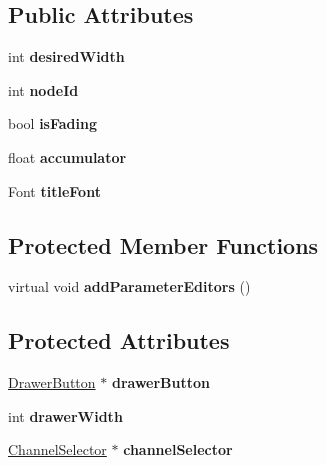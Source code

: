 \subsection*{Public Attributes}
\begin{DoxyCompactItemize}
\item 
\hypertarget{classGenericEditor_ab5b6f3450c9376c313fe8925bfbe4bc9}{int {\bfseries desired\-Width}}\label{classGenericEditor_ab5b6f3450c9376c313fe8925bfbe4bc9}

\item 
\hypertarget{classGenericEditor_a53166218592772efb4f6ef664ec4763b}{int {\bfseries node\-Id}}\label{classGenericEditor_a53166218592772efb4f6ef664ec4763b}

\item 
\hypertarget{classGenericEditor_af961769014471610d0eeeeefb8e712ef}{bool {\bfseries is\-Fading}}\label{classGenericEditor_af961769014471610d0eeeeefb8e712ef}

\item 
\hypertarget{classGenericEditor_ab4430a824b8ea6f3d3bd55ef037c40d2}{float {\bfseries accumulator}}\label{classGenericEditor_ab4430a824b8ea6f3d3bd55ef037c40d2}

\item 
\hypertarget{classGenericEditor_ac544d3401113c612bf992feacc68d961}{Font {\bfseries title\-Font}}\label{classGenericEditor_ac544d3401113c612bf992feacc68d961}

\end{DoxyCompactItemize}
\subsection*{Protected Member Functions}
\begin{DoxyCompactItemize}
\item 
\hypertarget{classGenericEditor_aace3206666ab83eb3f89d604bbe1998f}{virtual void {\bfseries add\-Parameter\-Editors} ()}\label{classGenericEditor_aace3206666ab83eb3f89d604bbe1998f}

\end{DoxyCompactItemize}
\subsection*{Protected Attributes}
\begin{DoxyCompactItemize}
\item 
\hypertarget{classGenericEditor_afb5e6e83bf76e18fb0d3d2b1d75ee8b5}{\hyperlink{classDrawerButton}{Drawer\-Button} $\ast$ {\bfseries drawer\-Button}}\label{classGenericEditor_afb5e6e83bf76e18fb0d3d2b1d75ee8b5}

\item 
\hypertarget{classGenericEditor_a4f24167f68b01041cebdcb15d161432d}{int {\bfseries drawer\-Width}}\label{classGenericEditor_a4f24167f68b01041cebdcb15d161432d}

\item 
\hypertarget{classGenericEditor_ab8a5e6c65cf62c23e9a9b2856c9b78f9}{\hyperlink{classChannelSelector}{Channel\-Selector} $\ast$ {\bfseries channel\-Selector}}\label{classGenericEditor_ab8a5e6c65cf62c23e9a9b2856c9b78f9}

\end{DoxyCompactItemize}
